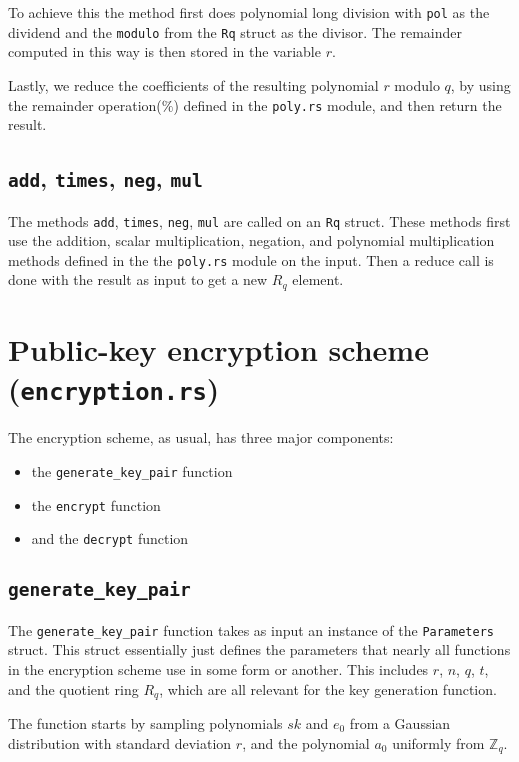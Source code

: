 \documentclass[../main.tex]{subfiles}
\begin{document}
To achieve this the method first does polynomial long division with \lstinline{pol} as the dividend and the \lstinline{modulo} from the \lstinline{Rq} struct as the divisor. The remainder computed in this way is then stored in the variable $r$.

Lastly, we reduce the coefficients of the resulting polynomial $r$ modulo $q$, by using the remainder operation($\%$) defined in the \lstinline{poly.rs} module, and then return the result.

\subsection{\lstinline{add}, \lstinline{times}, \lstinline{neg}, \lstinline{mul}}
The methods \lstinline{add}, \lstinline{times}, \lstinline{neg}, \lstinline{mul} are called on an \lstinline{Rq} struct. These methods first use the addition, scalar multiplication, negation, and polynomial multiplication methods defined in the the \lstinline{poly.rs} module on the input. Then a reduce call is done with the result as input to get a new $R_q$ element.

\section{Public-key encryption scheme (\lstinline{encryption.rs})}

The encryption scheme, as usual, has three major components:

\begin{itemize}
  \item the \lstinline{generate_key_pair} function
  \item the \lstinline{encrypt} function
  \item and the \lstinline{decrypt} function
\end{itemize}

\subsection{\lstinline{generate_key_pair}}

The \lstinline{generate_key_pair} function takes as input an instance of the \lstinline{Parameters} struct.
This struct essentially just defines the parameters that nearly all functions in the encryption scheme use in some form or another.
This includes $r$, $n$, $q$, $t$, and the quotient ring $R_q$, which are all relevant for the key generation function.

The function starts by sampling polynomials $sk$ and $e_0$ from a Gaussian distribution with standard deviation $r$, and the polynomial $a_0$ uniformly from $\mathbb{Z}_q$.
\end{document}
